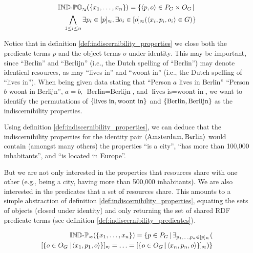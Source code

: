 \begin{definition}
\label{def:indiscernibility_properties}
\begin{align}
  \operatorname{{\mathbb{IND}-\mathbb{PO}}}_{\approx}(\{x_1,\ldots,x_n\})
=
  \{
    \langle p,o\rangle \in P_G \times O_G
  \,\vert\,\nonumber\\
    \bigwedge_{1 \leq i \leq n}
      \exists p_i \in [p]_{\approx},
        \exists o_i \in [o]_{\approx}(
          \langle x_i,p_i,o_i\rangle \in G
        )
  \}\nonumber
\end{align}
\end{definition}

\noindent Notice that in definition \ref{def:indiscernibility_properties}
  we close both the predicate terms $p$ and the object terms $o$
  under identity.
This may be important,
  since ``Berlin'' and ``Berlijn'' (i.e., the Dutch spelling of ``Berlin'')
  may denote identical resources, as may ``lives in'' and ``woont in''
  (i.e., the Dutch spelling of ``lives in'').
When being given data stating that ``Person $a$ lives in Berlin''
  ``Person $b$ woont in Berlijn'', $a = b$, $\text{Berlin} = \text{Berlijn}$,
  and $\text{lives is} = \text{woont in}$,
  we want to identify the permutations of
  $\{\text{lives in},\text{woont in}\}$ and
  $\{\text{Berlin},\text{Berlijn}\}$
  as the indiscernibility properties.

Using definition \ref{def:indiscernibility_properties},
  we can deduce that the indiscernibility properties for
  the identity pair $\langle\text{Amsterdam},\text{Berlin}\rangle$
  would contain (amongst many others) the properties
  ``is a city'', ``has more than 100,000 inhabitants'', and
  ``is located in Europe''.

But we are not only interested in the properties that resources share
  with one other (e.g., being a city, having more than 500,000 inhabitants).
We are also interested in the predicates that a set of resources share.
This amounts to a simple abstraction of
  definition \ref{def:indiscernibility_properties},
  equating the sets of objects (closed under identity)
  and only returning the set of shared RDF predicate terms
  (see definition \ref{def:indiscernibility_predicates}).

\begin{definition}
\label{def:indiscernibility_predicates}
\begin{align}
  \indp_{\approx}(\setrange{x_1}{x_n})
=
  \setdef{
    p \in P_G
  }{
    \exists_{\range{p_1}{p_n} \in \equivset{p}}(\\
        \equivset{
          \setdef{
            o \in O_G
          }{
            \triple{x_1}{p_1}{o}
          }
        }
      =
        \ldots
      =
        \equivset{
          \setdef{
            o \in O_G
          }{
            \triple{x_n}{p_n}{o}
          }
        }
    )
  }\nonumber
\end{align}
\end{definition}

